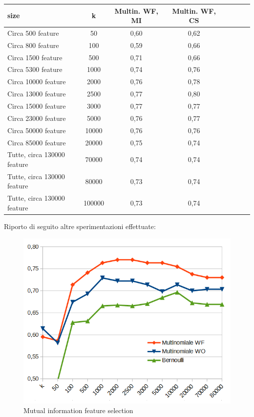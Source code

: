 \documentclass{article}
\theoremstyle{plain}
\theoremstyle{definition}
\begin{document}
\begin{tabular}{l*{6}{c}r}
size & k & Multin. WF, MI & Multin. WF, CS \\
\hline
Circa 500 feature & 50 & 0,60 & 0,62 \\
Circa 800 feature & 100 & 0,59 & 0,66 \\
Circa 1500 feature & 500 & 0,71 & 0,66 \\
Circa 5300 feature & 1000 & 0,74 & 0,76 \\
Circa 10000 feature & 2000 & 0,76 & 0,78 \\
Circa 13000 feature & 2500 & 0,77 & 0,80 \\
Circa 15000 feature & 3000 & 0,77 & 0,77 \\
Circa 23000 feature & 5000 & 0,76 & 0,77 \\
Circa 50000 feature & 10000 & 0,76 & 0,76 \\
Circa 85000 feature & 20000 & 0,75 & 0,74 \\
Tutte, circa 130000 feature & 70000 & 0,74 & 0,74 \\
Tutte, circa 130000 feature & 80000 & 0,73 & 0,74 \\
Tutte, circa 130000 feature & 100000 & 0,73 & 0,74 \\
\end{tabular}
\newpage
Riporto di seguito altre sperimentazioni effettuate:
\begin{figure}[htbp]
\begin{center}
\includegraphics[scale=0.55]{img/gr2.png}
\caption{Mutual information feature selection}
\end{center}
\end{figure}
\end{document}

